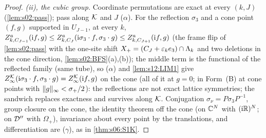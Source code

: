 \begin{proof}
\emph{(ii), the cubic group.} Coordinate permutations are exact at every $(k,J)$ (\cref{lem:s02:pass}); pass along $\mathcal K$ and $J$ ($\alpha$). For the reflection $\sigma_3$ and a cone point $(f,g)$ supported in $U_{J-1}$, at every $k$, $Z^a_{k,C_{J-1}}(\mathrm if,g)\le Z^a_{k,C_J}(\mathrm i\sigma_3\cdot f,\sigma_3\cdot g)\le Z^a_{k,C_{J+1}}(\mathrm if,g)$ (the frame flip of \cref{lem:s02:pass} with the one-site shift $X_+=(C_J+\varepsilon_ke_3)\cap\Lambda_k$ and two deletions in the cone direction, \cref{lem:s02:BFS}(a),(b)); the middle term is the functional of the reflected family (same tube), so ($\alpha$) and \cref{lem:s12:LIM1} give $Z^{\mathcal K}_{\infty}(\mathrm i\sigma_3\cdot f,\sigma_3\cdot g)=Z^{\mathcal K}_{\infty}(\mathrm if,g)$ on the cone (all of it at $g=0$; in Form~(B) at cone points with $\lVert g\rVert_\infty<\sigma_+/2$): the reflections are not exact lattice symmetries; the sandwich replaces exactness and survives along $\mathcal K$. Conjugation $\sigma_\nu=P\sigma_3P^{-1}$, group closure on the cone, the identity theorem off the cone (on $\mathbb C^N$ with $(\mathrm i\mathbb R)^N$; on $\mathcal D''$ with $\Omega_+$), invariance about every point by the translations, and differentiation are ($\gamma$), as in \cref{thm:s06:S1K}.


\end{proof}

